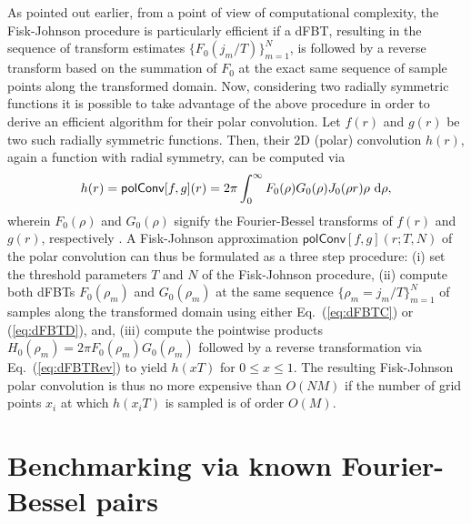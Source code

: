 \documentclass[12pt]{iopart}
\begin{document}
As pointed out earlier, from a point of view of computational complexity, the 
Fisk-Johnson procedure is particularly efficient if a dFBT, resulting
in the sequence of transform estimates $\{F_0(j_m/T)\}_{m=1}^{N}$, is followed 
by a reverse transform based on the summation of $F_0$ at the exact same 
sequence of sample points along the transformed domain. 
Now, considering two radially symmetric functions it is possible to take
advantage of the above procedure in order to derive an efficient algorithm for
their polar convolution. Let $f(r)$ and $g(r)$ be two such radially symmetric
functions. Then, their $2$D (polar) convolution $h(r)$, again a function with
radial symmetry, can be computed via \cite{Baddour:2009} 
\begin{equation}
h(r) = {\mathsf{polConv}}[f,g](r) = 2 \pi \int_{0}^\infty 
F_0(\rho) G_0(\rho) J_0(\rho r)\rho~{\rm{d}}\rho, \label{eq:polConv}
\end{equation}
wherein $F_0(\rho)$ and $G_0(\rho)$ signify the Fourier-Bessel transforms of
$f(r)$ and $g(r)$, respectively \cite{comment:polConv}. A Fisk-Johnson 
approximation ${\mathsf{polConv}}[f,g](r;T,N)$ of the polar convolution can thus be 
formulated as a three step procedure:
(i) set the threshold parameters $T$ and $N$ of the Fisk-Johnson procedure,
(ii) compute both dFBTs $F_0(\rho_m)$ and $G_0(\rho_m)$
at the same sequence $\{\rho_m = j_m/T\}_{m=1}^N$ of samples along the 
transformed domain using either Eq.~(\ref{eq:dFBTC}) or (\ref{eq:dFBTD}), and,
(iii) compute the pointwise products $H_0(\rho_m)=2\pi F_0(\rho_m)G_0(\rho_m)$ 
followed by a reverse transformation via Eq.~(\ref{eq:dFBTRev}) to yield
$h(xT)$ for $0\leq x \leq 1$.
The resulting Fisk-Johnson polar convolution is thus no more expensive than
$O(NM)$ if the number of grid points $x_i$ at which $h(x_iT)$ is sampled  
is of order $O(M)$.

\section{Benchmarking via known Fourier-Bessel pairs}
\label{sec:examples}
\end{document}
